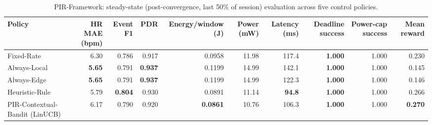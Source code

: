 \begin{table}[t]
\centering
\caption{PIR-Framework: steady-state (post-convergence, last 50\% of session) evaluation across five control policies.}
\label{tab:pir_overall}
\begin{tabular}{lrrrrrrrrr}
\toprule
Policy & HR MAE (bpm) & Event F1 & PDR & Energy/window (J) & Power (mW) & Latency (ms) & Deadline success & Power-cap success & Mean reward \\
\midrule
Fixed-Rate & 6.30 & 0.786 & 0.917 & 0.0958 & 11.98 & 117.4 & \textbf{1.000} & 1.000 & 0.230 \\
Always-Local & \textbf{5.65} & 0.791 & \textbf{0.937} & 0.1199 & 14.99 & 142.1 & \textbf{1.000} & 1.000 & 0.145 \\
Always-Edge & \textbf{5.65} & 0.791 & \textbf{0.937} & 0.1199 & 14.99 & 122.3 & \textbf{1.000} & 1.000 & 0.146 \\
Heuristic-Rule & 5.79 & \textbf{0.804} & 0.930 & 0.0891 & 11.14 & \textbf{94.8} & \textbf{1.000} & 1.000 & 0.266 \\
PIR-Contextual-Bandit (LinUCB) & 6.17 & 0.790 & 0.920 & \textbf{0.0861} & 10.76 & 106.3 & \textbf{1.000} & 1.000 & \textbf{0.270} \\
\bottomrule
\end{tabular}
\end{table}